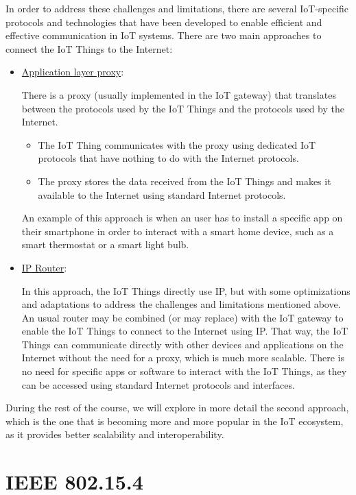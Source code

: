 In order to address these challenges and limitations, there are several IoT-specific protocols and technologies that have been developed to enable efficient and effective communication in IoT systems. There are two main approaches to connect the IoT Things to the Internet:
\begin{itemize}
    \item \ul{Application layer proxy}: 
    
    There is a proxy (usually implemented in the IoT gateway) that translates between the protocols used by the IoT Things and the protocols used by the Internet.
    \begin{itemize}
        \item The IoT Thing communicates with the proxy using dedicated IoT protocols that have nothing to do with the Internet protocols.
        \item The proxy stores the data received from the IoT Things and makes it available to the Internet using standard Internet protocols.
    \end{itemize}

    An example of this approach is when an user has to install a specific app on their smartphone in order to interact with a smart home device, such as a smart thermostat or a smart light bulb.


    \item \ul{IP Router}:
    
    In this approach, the IoT Things directly use IP, but with some optimizations and adaptations to address the challenges and limitations mentioned above. An usual router may be combined (or may replace) with the IoT gateway to enable the IoT Things to connect to the Internet using IP. That way, the IoT Things can communicate directly with other devices and applications on the Internet without the need for a proxy, which is much more scalable. There is no need for specific apps or software to interact with the IoT Things, as they can be accessed using standard Internet protocols and interfaces.

\end{itemize}

During the rest of the course, we will explore in more detail the second approach, which is the one that is becoming more and more popular in the IoT ecosystem, as it provides better scalability and interoperability.


\section{IEEE 802.15.4}

